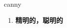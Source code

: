 
\begin{frame}
{\huge canny}
\begin{center}
\begin{enumerate}\Large
  \item \textbf{精明的，聪明的}
\end{enumerate}
\end{center}
\end{frame}
